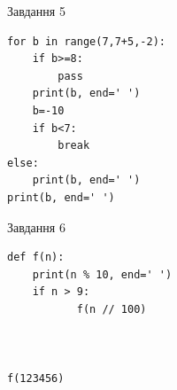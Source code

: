 \documentclass[12pt, ukrainian]{article}
\begin{document}
{\vspace{15mm}
\begin{minipage}[t]{9.7cm}                
{\begin{center}Завдання {5}\end{center}}
\begin{verbatim}
for b in range(7,7+5,-2):
    if b>=8:
        pass
    print(b, end=' ')
    b=-10
    if b<7:
        break
else:
    print(b, end=' ')
print(b, end=' ')
\end{verbatim}     
\end{minipage}
\vline \hspace{8mm}
\begin{minipage}[t]{8.0cm}                
{\begin{center}Завдання {6}\end{center}}
\begin{verbatim}
def f(n):
    print(n % 10, end=' ')
    if n > 9:
           f(n // 100)
    


f(123456)
\end{verbatim}     
\end{minipage}

}
\newpage
\end{document}
